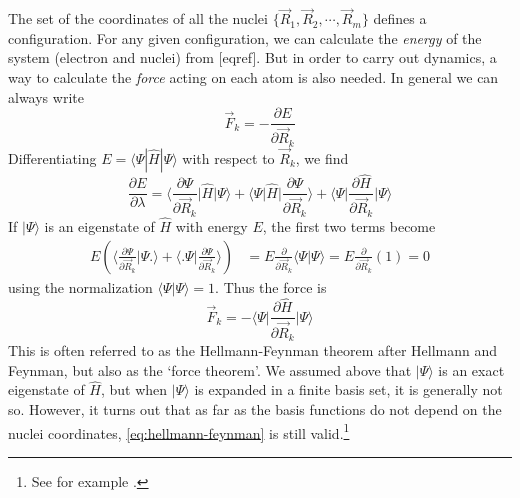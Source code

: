 \documentclass[11pt]{scrbook}   %
\begin{document}
The set of the coordinates of all the nuclei $\{\vec{R}_1,\vec{R}_2,\cdots,\vec{R}_m\}$ defines a configuration. 
For any given configuration, we can calculate the \emph{energy} of the system (electron and nuclei) from [eqref].
But in order to carry out dynamics, a way to calculate the \emph{force} acting on each atom is also needed. 
In general we can always write
\begin{equation}
  \vec{F}_k = -\frac{\partial E}{\partial\vec{R}_k}
\end{equation}
Differentiating $E=\langle\Psi|\hat{H}|\Psi\rangle$ with respect to $\vec{R}_k$, we find
\begin{equation}
  \frac{\partial E}{\partial\lambda} 
  = \biggl\langle \frac{\partial\Psi}{\partial\vec{R}_k} \biggl| \hat{H} \biggr| \Psi \biggr\rangle
  + \biggl\langle \Psi \biggl| \hat{H} \biggr| \frac{\partial\Psi}{\partial\vec{R}_k} \biggr\rangle
  + \biggl\langle \Psi \biggl| \frac{\partial\hat{H}}{\partial\vec{R}_k} \biggr| \Psi \biggr\rangle
\end{equation}
If $|\Psi\rangle$ is an eigenstate of $\hat{H}$ with energy $E$, the first two terms become
\begin{align}
  E \left (\biggl\langle \frac{\partial\Psi}{\partial\vec{R}_k} \biggl| \Psi \biggr. \biggr\rangle
  + \biggl\langle\biggl. \Psi \biggr| \frac{\partial\Psi}{\partial\vec{R}_k} \biggr\rangle \right) 
  &= E \frac{\partial}{\partial\vec{R}_k} \langle \Psi | \Psi \rangle 
  = E \frac{\partial}{\partial\vec{R}_k} (1) = 0
\end{align}
using the normalization $\langle\Psi|\Psi\rangle=1$. Thus the force is
\begin{equation}
  \vec{F}_k = - \biggl\langle \Psi \biggl| \frac{\partial\hat{H}}{\partial\vec{R}_k} \biggr| \Psi \biggr\rangle
  \label{eq:hellmann-feynman}
\end{equation}
This is often referred to as the Hellmann-Feynman theorem after Hellmann\cite{Hellmann:1937} 
and Feynman\cite{Feynman:1939}, but also as the `force theorem'\cite[56]{Martin:2004}. 
We assumed above that $|\Psi\rangle$ is an exact eigenstate of $\hat{H}$, but when $|\Psi\rangle$ is expanded in a finite basis set, it is generally not so.
However, it turns out that as far as the basis functions do not depend on the nuclei coordinates, \eqref{eq:hellmann-feynman} is still valid.\footnote{See for example \cite[557]{Kantorovich:2004}.}
\end{document}

